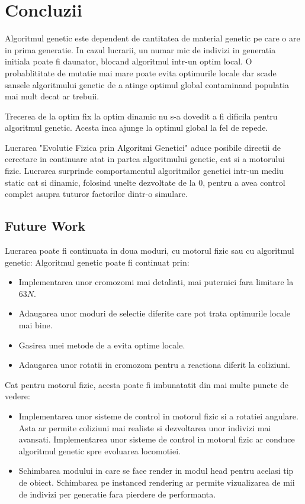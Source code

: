 \chapter*{Concluzii} 

Algoritmul genetic este dependent de cantitatea de material genetic pe care o are in prima generatie. In cazul lucrarii, un numar mic de indivizi in generatia initiala poate fi daunator, blocand algoritmul intr-un optim local.
O probablititate de mutatie mai mare poate evita optimurile locale dar scade sansele algoritmului genetic de a atinge optimul global contaminand populatia mai mult decat ar trebuii.

Trecerea de la optim fix la optim dinamic nu s-a dovedit a fi dificila pentru algoritmul genetic. Acesta inca ajunge la optimul global la fel de repede.

Lucrarea "Evolutie Fizica prin Algoritmi Genetici" aduce posibile directii de cercetare in continuare atat in partea algoritmului genetic, cat si a motorului fizic. Lucrarea surprinde comportamentul algoritmilor genetici intr-un mediu static cat si dinamic, folosind unelte dezvoltate de la 0, pentru a avea control complet asupra tuturor factorilor dintr-o simulare.

\section{Future Work}

Lucrarea poate fi continuata in doua moduri, cu motorul fizic sau cu algoritmul genetic:
Algoritmul genetic poate fi continuat prin:
\begin{itemize}
    \item Implementarea unor cromozomi mai detaliati, mai puternici fara limitare la 63$N$.
    \item Adaugarea unor moduri de selectie diferite care pot trata optimurile locale mai bine.
    \item Gasirea unei metode de a evita optime locale.
    \item Adaugarea unor rotatii in cromozom pentru a reactiona diferit la coliziuni.
\end{itemize}

Cat pentru motorul fizic, acesta poate fi imbunatatit din mai multe puncte de vedere:
\begin{itemize}
    \item Implementarea unor sisteme de control in motorul fizic si a rotatiei angulare. Asta ar permite coliziuni mai realiste si dezvoltarea unor indivizi mai avansati. Implementarea unor sisteme de control in motorul fizic ar conduce algoritmul genetic spre evoluarea locomotiei.
    \item Schimbarea modului in care se face render in modul head pentru acelasi tip de obiect. Schimbarea pe instanced rendering ar permite vizualizarea de mii de indivizi per generatie fara pierdere de performanta.
\end{itemize}